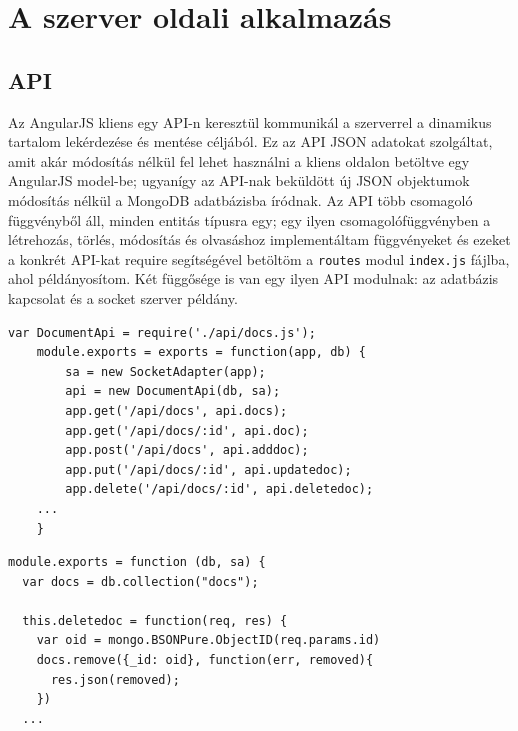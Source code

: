 \section{A szerver oldali alkalmazás}

\subsection{API}

Az AngularJS kliens egy API-n keresztül kommunikál a szerverrel a dinamikus tartalom lekérdezése és mentése céljából. Ez az API JSON adatokat szolgáltat, amit akár módosítás nélkül fel lehet használni a kliens oldalon betöltve egy AngularJS model-be; ugyanígy az API-nak beküldött új JSON objektumok módosítás nélkül a MongoDB adatbázisba íródnak. Az API több csomagoló függvényből áll, minden entitás típusra egy; egy ilyen csomagolófüggvényben a létrehozás, törlés, módosítás és olvasáshoz implementáltam függvényeket és ezeket a konkrét API-kat require segítségével betöltöm a \lstinline{routes} modul \lstinline{index.js} fájlba, ahol példányosítom. Két függősége is van egy ilyen API modulnak: az adatbázis kapcsolat és a socket szerver példány.

\begin{lstlisting}[caption=API végpontok bekötése az alkalmazás URL szabályai közé]
    var DocumentApi = require('./api/docs.js');
    module.exports = exports = function(app, db) {
        sa = new SocketAdapter(app);
        api = new DocumentApi(db, sa);
        app.get('/api/docs', api.docs);
        app.get('/api/docs/:id', api.doc);
        app.post('/api/docs', api.adddoc);
        app.put('/api/docs/:id', api.updatedoc);
        app.delete('/api/docs/:id', api.deletedoc);
    ...
    }

\end{lstlisting}

\begin{lstlisting}[caption=Diagram API és annak egy metódusa]
module.exports = function (db, sa) {
  var docs = db.collection("docs");

  this.deletedoc = function(req, res) {
    var oid = mongo.BSONPure.ObjectID(req.params.id)
    docs.remove({_id: oid}, function(err, removed){
      res.json(removed);
    })  
  ...

\end{lstlisting}

